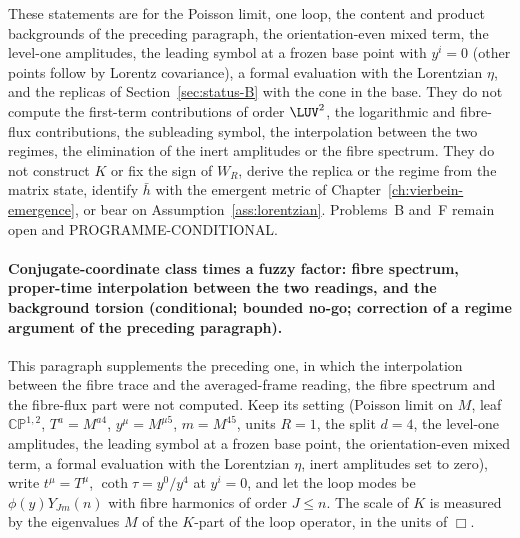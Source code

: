These statements are for the Poisson limit, one loop, the content and product backgrounds of the preceding paragraph, the orientation-even mixed term, the level-one amplitudes, the leading symbol at a frozen base point with \(y^i=0\) (other points follow by Lorentz covariance), a formal evaluation with the Lorentzian \(\eta\), and the replicas of Section~\ref{sec:status-B} with the cone in the base. They do not compute the first-term contributions of order \(\LUV^2\), the logarithmic and fibre-flux contributions, the subleading symbol, the interpolation between the two regimes, the elimination of the inert amplitudes or the fibre spectrum. They do not construct \(K\) or fix the sign of \(W_R\), derive the replica or the regime from the matrix state, identify \(\bar h\) with the emergent metric of Chapter~\ref{ch:vierbein-emergence}, or bear on Assumption~\ref{ass:lorentzian}. Problems~B and~F remain open and PROGRAMME-CONDITIONAL.

\paragraph{Conjugate-coordinate class times a fuzzy factor: fibre spectrum, proper-time interpolation between the two readings, and the background torsion (conditional; bounded no-go; correction of a regime argument of the preceding paragraph).}
This paragraph supplements the preceding one, in which the interpolation between the fibre trace and the averaged-frame reading, the fibre spectrum and the fibre-flux part were not computed. Keep its setting (Poisson limit on \(M\), leaf \(\mathbb{CP}^{1,2}\), \(T^a=M^{a4}\), \(y^\mu=M^{\mu5}\), \(m=M^{45}\), units \(R=1\), the split \(d=4\), the level-one amplitudes, the leading symbol at a frozen base point, the orientation-even mixed term, a formal evaluation with the Lorentzian \(\eta\), inert amplitudes set to zero), write \(t^\mu=T^\mu\), \(\coth\tau=y^0/y^4\) at \(y^i=0\), and let the loop modes be \(\phi(y)Y_{Jm}(n)\) with fibre harmonics of order \(J\le n\). The scale of \(K\) is measured by the eigenvalues \(M\) of the \(K\)-part of the loop operator, in the units of \(\Box\).

